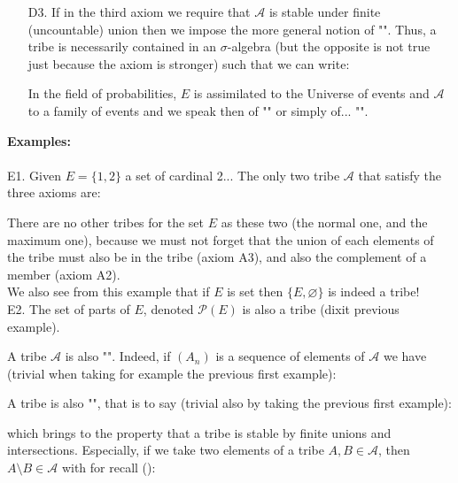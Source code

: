 \begin{enumerate}
	\item[D3.] If in the third axiom we require that $\mathcal{A}$ is stable under finite (uncountable) union then we impose the more general notion of "\label{sigma algebra}". Thus, a tribe is necessarily contained in an $\sigma$-algebra (but the opposite is not true just because the axiom is stronger) such that we can write:
	
	\begin{tcolorbox}[title=Remark,colframe=black,arc=10pt]
	In the field of probabilities, $E$ is assimilated to the Universe of events and $\mathcal{A}$ to a family of events and we speak then of "" or simply of... "".
	\end{tcolorbox}	
	\end{enumerate}
	\begin{tcolorbox}[colframe=black,colback=white,sharp corners]
	\textbf{{\Large {}}Examples:}\\\\
	E1. Given $E=\{1,2\}$ a set of cardinal 2... The only two tribe $\mathcal{A}$ that satisfy the three axioms are:
	
	There are no other tribes for the set $E$ as these two (the normal one, and the maximum one), because we must not forget that the union of each elements of the tribe must also be in the tribe (axiom A3), and also the complement of a member (axiom A2).\\
	
	We also see from this example that if $E$ is set then $\{E,\varnothing\}$ is indeed a tribe!\\
	
	E2. The set of parts of $E$, denoted $\mathcal{P}(E)$ is also a tribe (dixit previous example).
	\end{tcolorbox}
	A tribe $\mathcal{A}$ is also "". Indeed, if $(A_n)$ is a sequence of elements of $\mathcal{A}$ we have (trivial when taking for example the previous first example):
	
	A tribe is also "", that is to say (trivial also by taking the previous first example):
	
	which brings to the property that a tribe is stable by finite unions and intersections. Especially, if we take two elements of a tribe $A,B\in \mathcal{A}$, then $A\setminus B\in \mathcal{A}$ with for recall ():
	

